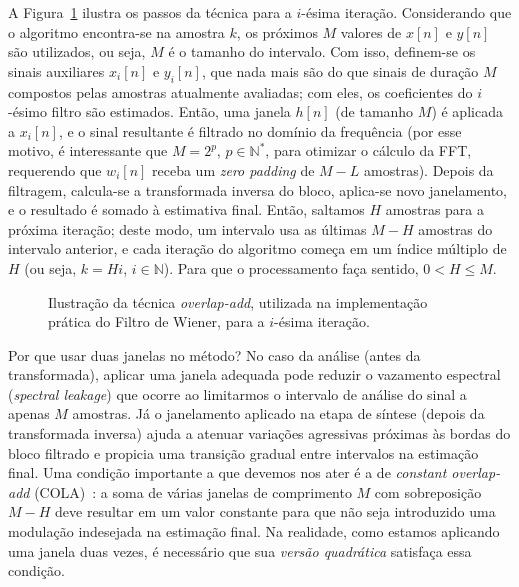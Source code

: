 A Figura~\ref{fig:wf:overlap-add} ilustra os passos da técnica para a $i$-ésima iteração. Considerando que o algoritmo encontra-se na amostra $k$, os próximos $M$ valores de $x[n]$ e $y[n]$ são utilizados, ou seja, $M$ é o tamanho do intervalo. Com isso, definem-se os sinais auxiliares $x_i[n]$ e $y_i[n]$, que nada mais são do que sinais de duração $M$ compostos pelas amostras atualmente avaliadas; com eles, os coeficientes do $i$-ésimo filtro são estimados. Então, uma janela $h[n]$ (de tamanho $M$) é aplicada a $x_i[n]$, e o sinal resultante é filtrado no domínio da frequência (por esse motivo, é interessante que $M = 2^p$, $p \in \mathbb{N}^*$, para otimizar o cálculo da FFT, requerendo que $w_i[n]$ receba um \textit{zero padding} de $M - L$ amostras). Depois da filtragem, calcula-se a transformada inversa do bloco, aplica-se novo janelamento, e o resultado é somado à estimativa final. Então, saltamos $H$ amostras para a próxima iteração; deste modo, um intervalo usa as últimas $M-H$ amostras do intervalo anterior, e cada iteração do algoritmo começa em um índice múltiplo de $H$ (ou seja, $k = Hi$, $i \in \mathbb{N}$). Para que o processamento faça sentido, $0 < H \leq M$.
\begin{figure}
    \centering
    
    \caption[Ilustração do método utilizado no Filtro de Wiener]{Ilustração da técnica \textit{overlap-add}, utilizada na implementação prática do Filtro de Wiener, para a $i$-ésima iteração.}
    \label{fig:wf:overlap-add}
\end{figure}

Por que usar duas janelas no método? No caso da análise (antes da transformada), aplicar uma janela adequada pode reduzir o vazamento espectral (\textit{spectral leakage}) que ocorre ao limitarmos o intervalo de análise do sinal a apenas $M$ amostras. Já o janelamento aplicado na etapa de síntese (depois da transformada inversa) ajuda a atenuar variações agressivas próximas às bordas do bloco filtrado e propicia uma transição gradual entre intervalos na estimação final. Uma condição importante a que devemos nos ater é a de \textit{constant overlap-add} (COLA)~\cite{bosi-2002}: a soma de várias janelas de comprimento $M$ com sobreposição $M-H$ deve resultar em um valor constante para que não seja introduzido uma modulação indesejada na estimação final. Na realidade, como estamos aplicando uma janela duas vezes, é necessário que sua \emph{versão quadrática} satisfaça essa condição.

